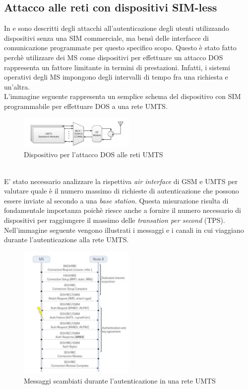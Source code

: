 \clearpage

\subsection{Attacco alle reti con dispositivi SIM-less}
In \cite{umts-dos} e \cite{gsm-dos-simless} sono descritti degli attacchi all'autenticazione degli utenti utilizzando dispositivi senza una SIM commerciale, ma bensì delle interfacce di comunicazione 
programmate per questo specifico scopo. Questo è stato fatto perchè utilizzare dei MS come dispositivi per effettuare un attacco DOS rappresenta un fattore limitante in termini di prestazioni. Infatti, 
i sistemi operativi degli MS impongono degli intervalli di tempo fra una richiesta e un'altra.\\
L'immagine seguente rappresenta un semplice schema del dispositivo con SIM programmabile per effettuare DOS a una rete UMTS\cite{umts-dos}.
\begin{figure}[h]
    \centering
    \includegraphics[width=0.5\textwidth]{images/umts-dos-device.png}
    \caption{Dispositivo per l'attacco DOS alle reti UMTS\cite{umts-dos}}
\end{figure}\\
E' stato necessario analizzare la rispettiva \textit{air interface} di GSM e UMTS per valutare quale è il numero massimo di richieste di autenticazione 
che possono essere inviate al secondo a una \textit{base station}. Questa misurazione risulta di fondamentale importanza poichè riesce anche a fornire il numero necessario 
di dispositivi per raggiungere il massimo delle \textit{transation per second} (TPS).
Nell'immagine seguente vengono illustrati i messaggi e i canali in cui viaggiano durante l'autenticazione alla rete UMTS.
\begin{figure}[h]
    \centering
    \includegraphics[width=0.5\textwidth]{images/umts-air-channel.png}
    \caption{Messaggi scambiati durante l'autenticazione in una rete UMTS\cite{umts-dos}}
\end{figure}\\
